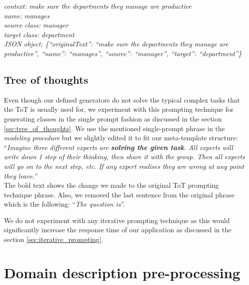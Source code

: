 \noindent{}\textit{context: make sure the departments they manage are productive} \\
\textit{name: manages} \\
\textit{source class: manager} \\
\textit{target class: department} \\
\textit{JSON object: \{``originalText'': ``make sure the departments they manage are productive'', ``name'': ``manages'', ``source'': ``manager'', ``target'': ``department''\}}


\subsection{Tree of thoughts}

Even though our defined generators do not solve the typical complex tasks that the ToT is usually used for, we experiment with this prompting technique for generating classes in the single prompt fashion as discussed in the section \ref{sec:tree_of_thoughts}. We use the mentioned single-prompt phrase in the \emph{modeling procedure} but we slightly edited it to fit our meta-template structure: \\

\noindent{}``\textit{Imagine three different experts are \textbf{solving the given task}. All experts will write down 1 step of their thinking, then share it with the group. Then all experts will go on to the next step, etc. If any expert realises they are wrong at any point they leave.}'' \\

\noindent{}The bold text shows the change we made to the original ToT prompting technique phrase. Also, we removed the last sentence from the original phrase which is the following: ``\textit{The question is}''.

We do not experiment with any iterative prompting technique as this would significantly increase the response time of our application as discussed in the section \ref{sec:iterative_prompting}.



\section{Domain description pre-processing}

